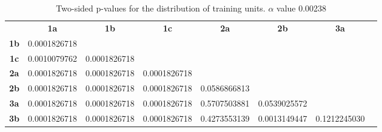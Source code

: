\begin{table}[h!]
    \centering
    \begin{tabular}{cccccccc}
                              & \textbf{1a}  & \textbf{1b}  & \textbf{1c}  & \textbf{2a}        & \textbf{2b}        & \textbf{3a}       \\
    \textbf{1b}               & 0.0001826718 &              &              &                    &                    &                   \\
    \textbf{1c}               & 0.0010079762 & 0.0001826718 &              &                    &                    &                   \\
    \textbf{2a}               & 0.0001826718 & 0.0001826718 & 0.0001826718 &                    &                    &                   \\
    \textbf{2b}               & 0.0001826718 & 0.0001826718 & 0.0001826718 & 0.0586866813       &                    &                   \\
    \textbf{3a}               & 0.0001826718 & 0.0001826718 & 0.0001826718 & 0.5707503881       & 0.0539025572       &                   \\
    \textbf{3b}               & 0.0001826718 & 0.0001826718 & 0.0001826718 & 0.4273553139       & 0.0013149447       & 0.1212245030
    \end{tabular}
    \caption[p-table for training units]{Two-sided p-values for the distribution of training units. \(\alpha\) value 0.00238}
    \label{tab:exp2.trainingptable}
\end{table}